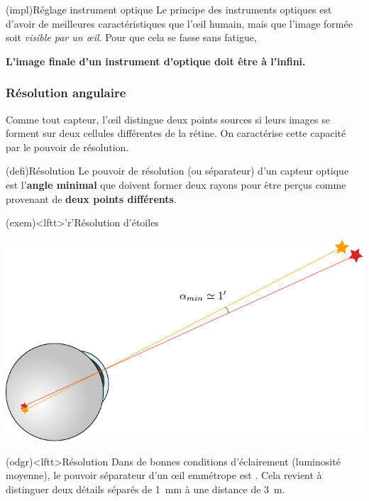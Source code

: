 \documentclass[../../main/main.tex]{subfiles}
\begin{document}
\begin{tcb*}[label=impl:instrument_opt](impl){Réglage instrument optique}
	Le principe des instruments optiques est d'avoir de meilleures
	caractéristiques que l'œil humain, mais que l'image formée soit
	\textit{visible par un œil}. Pour que cela se fasse sans fatigue,
	\begin{center}
		\textbf{L'image finale d'un instrument d'optique doit être à l'infini.}
	\end{center}
\end{tcb*}

\vspace{-15pt}
\subsubsection{Résolution angulaire}
Comme tout capteur, l'œil distingue deux points sources si leurs images se
forment sur deux cellules différentes de la rétine. On caractérise cette
capacité par le pouvoir de résolution.
\begin{tcbraster}[raster columns=2, raster equal height=rows]
	\begin{tcb*}[label=def:resolu](defi){Résolution}
		Le pouvoir de résolution (ou séparateur) d'un capteur optique est
		l'\textbf{angle minimal} que doivent former deux rayons pour être perçus
		comme provenant de \textbf{deux points différents}.
	\end{tcb*}
	\begin{tcb}(exem)<lftt>'r'{Résolution d'étoiles}
		\begin{center}
			\includegraphics[width=.75\linewidth]{res_stars}
		\end{center}
	\end{tcb}
\end{tcbraster}
\begin{tcb*}[label=odgr:resolu](odgr)<lftt>{Résolution}
	Dans de bonnes conditions d'éclairement (luminosité moyenne), le pouvoir
	séparateur d'un œil emmétrope est . Cela revient à distinguer deux détails séparés de
	\SI{1}{mm} à une distance de \SI{3}{m}.
\end{tcb*}
\end{document}
